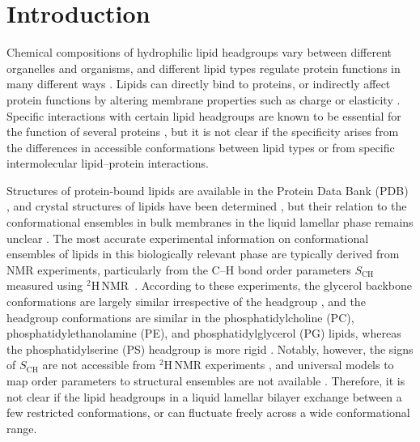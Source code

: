 \documentclass[aps,prl,superscriptaddress,twocolumn]{revtex4}
\begin{document}


\section{Introduction}

Chemical compositions of hydrophilic lipid headgroups vary between different
organelles and organisms, and different lipid types
regulate protein functions in many different ways \cite{lee03,vanmeer08}.
Lipids can directly bind to proteins, or indirectly affect protein
functions by altering membrane properties such as charge or elasticity \cite{lee03,lemmon08}.
Specific interactions with certain lipid headgroups
are known to be essential for the function of several proteins \cite{lee11,lemmon08},
but it is not clear if the specificity arises from the
differences in accessible conformations between lipid types or
from specific intermolecular lipid--protein interactions.

Structures of protein-bound lipids are available in the Protein Data Bank (PDB) \cite{berman00},
and crystal structures of lipids have been determined \cite{buldt81,pascher92},
but their relation to the conformational ensembles in bulk membranes in the liquid lamellar phase remains unclear \cite{marsh13b}.
The most accurate experimental information on conformational ensembles of lipids
in this biologically relevant phase are typically derived from NMR experiments, particularly from the
C--H bond order parameters $S_\mathrm{CH}$ measured using $^2$H\,NMR~\cite{seelig77c,davis83,Semchyschyn04}.
According to these experiments, the glycerol backbone conformations are largely similar irrespective of the headgroup \cite{gally81}, and
the headgroup conformations are similar in the phosphatidylcholine (PC), phosphatidylethanolamine (PE), and phosphatidylglycerol (PG) lipids,
whereas the phosphatidylserine (PS) headgroup is more rigid \cite{wohlgemuth80,buldt81}. 
Notably, however, the signs of $S_\mathrm{CH}$ are not accessible from $^2$H\,NMR experiments \cite{ollila16},
and universal models to map order parameters to structural ensembles are not available \cite{pezeshkian18,akutsu20}.
Therefore, it is not clear if the lipid headgroups in a liquid lamellar bilayer exchange between a few restricted conformations, or can fluctuate freely across a wide conformational range.
\end{document}
